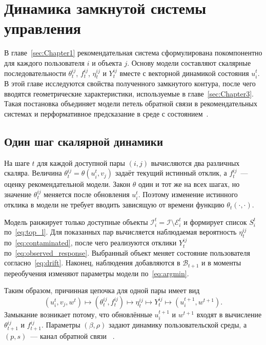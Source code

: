 \section{Динамика замкнутой системы управления}
\label{sec:Chapter2} 

В главе~\ref{sec:Chapter1} рекомендательная система сформулирована
покомпонентно для каждого пользователя $i$ и объекта $j$. Основу модели
составляют скалярные последовательности $\theta_t^{ij}$, $f_t^{ij}$,
$\eta_t^{ij}$ и $Y_t^{ij}$ вместе с векторной динамикой состояния $u_i^t$.
В этой главе исследуются свойства полученного замкнутого контура, после чего
вводятся геометрические характеристики, используемые в
главе~\ref{sec:Chapter3}. Такая постановка объединяет модели петель обратной
связи в рекомендательных системах и перформативное предсказание в среде с
состоянием~\cite{krauth2022, pagan2023feedbackLoops,
brown2022stateful}.

\subsection{Один шаг скалярной динамики}
\label{subsec:one_step}

На шаге $t$ для каждой доступной пары $(i,j)$ вычисляются два различных
скаляра. Величина $\theta_t^{ij}=\theta(u_i^t,v_j)$ задаёт текущий истинный
отклик, а $f_t^{ij}$~--- оценку рекомендательной модели. Закон $\theta$ один и
тот же на всех шагах, но значение $\theta_t^{ij}$ меняется после обновления
$u_i^t$. Поэтому изменение истинного отклика в модели не требует вводить
зависящую от времени функцию $\theta_t(\cdot,\cdot)$.

Модель ранжирует только доступные объекты
$\mathcal I_i^t=\mathcal I\setminus\mathcal E_i^t$ и формирует список $S_i^t$
по~\eqref{eq:top_l}. Для показанных пар вычисляется наблюдаемая вероятность
$\eta_t^{ij}$ по~\eqref{eq:contaminated}, после чего реализуются отклики
$Y_t^{ij}$ по~\eqref{eq:observed_response}. Выбранный объект меняет состояние
пользователя согласно~\eqref{eq:drift}. Наконец, наблюдения добавляются в
$\mathcal B_{t+1}$ и в моменты переобучения изменяют параметры модели
по~\eqref{eq:argmin}.

Таким образом, причинная цепочка для одной пары имеет вид
\[
    (u_i^t,v_j,w^t)
    \longmapsto
    (\theta_t^{ij},f_t^{ij})
    \longmapsto
    \eta_t^{ij}
    \longmapsto
    Y_t^{ij}
    \longmapsto
    (u_i^{t+1},w^{t+1}).
\]
Замыкание возникает потому, что обновлённые $u_i^{t+1}$ и $w^{t+1}$ входят в
вычисление $\theta_{t+1}^{ij}$ и $f_{t+1}^{ij}$. Параметры $(\beta,\rho)$ задают
динамику пользовательской среды, а $(p,s)$~--- канал обратной связи
~\cite{jiang2019, carroll2022, stoecker2025biasMitigation}.


